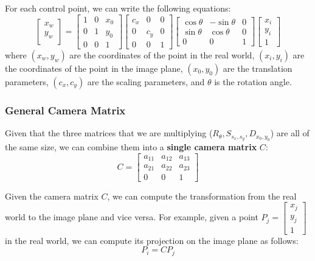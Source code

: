 For each control point, we can write the following equations:
\[ \begin{bmatrix}
    x_w \\ y_w \\
\end{bmatrix}
=\begin{bmatrix}
    1 & 0 & x_0 \\
    0 & 1 & y_0 \\
    0 & 0 & 1
\end{bmatrix}
\begin{bmatrix}
    c_x & 0 & 0 \\
    0 & c_y & 0 \\
    0 & 0 & 1
\end{bmatrix}
\begin{bmatrix}
    \cos \theta & -\sin \theta & 0 \\
    \sin \theta & \cos \theta & 0 \\
    0 & 0 & 1
\end{bmatrix}
\begin{bmatrix}
    x_i \\ y_i \\ 1
\end{bmatrix} \]
where \( (x_w, y_w) \) are the coordinates of the point in the real world, 
\( (x_i, y_i) \) are the coordinates of the point in the image plane, 
\( (x_0, y_0) \) are the translation parameters, 
\( (c_x, c_y) \) are the scaling parameters, 
and \( \theta \) is the rotation angle.

\subsubsection{General Camera Matrix}
Given that the three matrices that we are multiplying ($R_{\theta}, S_{s_x, s_y}, D_{x_0, y_0}$) are all of the same size,
we can combine them into a \textbf{single camera matrix} \( C \):
\[ C = \begin{bmatrix}
    a_{11} & a_{12} & a_{13} \\
    a_{21} & a_{22} & a_{23} \\
    0 & 0 & 1
\end{bmatrix} \]

Given the camera matrix \( C \), we can compute the transformation from the real world to the image plane and vice versa.
For example, given a point \( P_j = \begin{bmatrix} x_j \\ y_j \\ 1 \end{bmatrix} \) in the real world, we can compute its projection on the image plane as follows:
\[ P_i = C P_j \]

